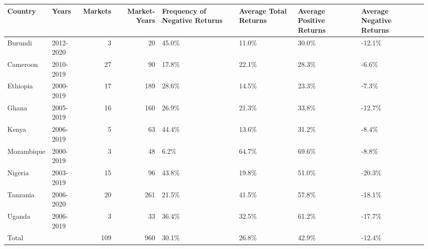 \begin{table}[ht]
\centering
\begin{tabular}{llrrllll}
  \hline
Country & Years & Markets & Market-Years & Frequency of Negative Returns & Average Total Returns & Average Positive Returns & Average Negative Returns \\ 
  \hline
Burundi & 2012-2020 &   3 &  20 & 45.0\% & 11.0\% & 30.0\% & -12.1\% \\ 
  Cameroon & 2010-2019 &  27 &  90 & 17.8\% & 22.1\% & 28.3\% & -6.6\% \\ 
  Ethiopia & 2000-2019 &  17 & 189 & 28.6\% & 14.5\% & 23.3\% & -7.3\% \\ 
  Ghana & 2005-2019 &  16 & 160 & 26.9\% & 21.3\% & 33.8\% & -12.7\% \\ 
  Kenya & 2006-2019 &   5 &  63 & 44.4\% & 13.6\% & 31.2\% & -8.4\% \\ 
  Mozambique & 2000-2019 &   3 &  48 & 6.2\% & 64.7\% & 69.6\% & -8.8\% \\ 
  Nigeria & 2003-2019 &  15 &  96 & 43.8\% & 19.8\% & 51.0\% & -20.3\% \\ 
  Tanzania & 2006-2020 &  20 & 261 & 21.5\% & 41.5\% & 57.8\% & -18.1\% \\ 
  Uganda & 2006-2019 &   3 &  33 & 36.4\% & 32.5\% & 61.2\% & -17.7\% \\ 
  Total &   & 109 & 960 & 30.1\% & 26.8\% & 42.9\% & -12.4\% \\ 
   \hline
\end{tabular}
\end{table}
